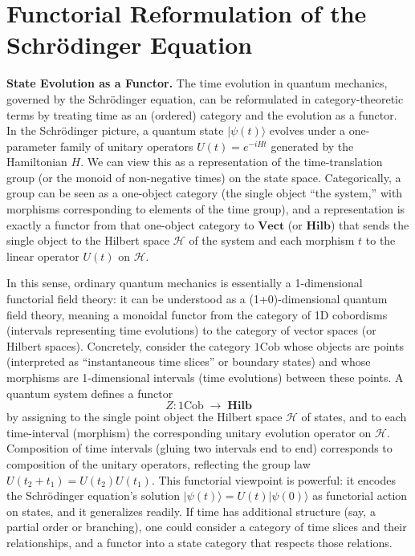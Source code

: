 \documentclass[12pt]{article}
\begin{document}
\section{Functorial Reformulation of the Schrödinger Equation}

\textbf{State Evolution as a Functor.}
The time evolution in quantum mechanics, governed by the Schrödinger equation, can be reformulated in category-theoretic terms by treating time as an (ordered) category and the evolution as a functor. In the Schrödinger picture, a quantum state $\lvert\psi(t)\rangle$ evolves under a one-parameter family of unitary operators $U(t) = e^{-iHt}$ generated by the Hamiltonian $H$. We can view this as a representation of the time-translation group (or the monoid of non-negative times) on the state space. Categorically, a group can be seen as a one-object category (the single object ``the system,'' with morphisms corresponding to elements of the time group), and a representation is exactly a functor from that one-object category to $\mathbf{Vect}$ (or $\mathbf{Hilb}$) that sends the single object to the Hilbert space $\mathcal{H}$ of the system and each morphism $t$ to the linear operator $U(t)$ on $\mathcal{H}$.

In this sense, ordinary quantum mechanics is essentially a 1-dimensional functorial field theory: it can be understood as a (1+0)-dimensional quantum field theory, meaning a monoidal functor from the category of 1D cobordisms (intervals representing time evolutions) to the category of vector spaces (or Hilbert spaces). Concretely, consider the category $1\mathrm{Cob}$ whose objects are points (interpreted as ``instantaneous time slices'' or boundary states) and whose morphisms are 1-dimensional intervals (time evolutions) between these points. A quantum system defines a functor
\[
   Z: 1\mathrm{Cob} \; \to \; \mathbf{Hilb}
\]
by assigning to the single point object the Hilbert space $\mathcal{H}$ of states, and to each time-interval (morphism) the corresponding unitary evolution operator on $\mathcal{H}$. Composition of time intervals (gluing two intervals end to end) corresponds to composition of the unitary operators, reflecting the group law $U(t_2 + t_1) = U(t_2)U(t_1)$. This functorial viewpoint is powerful: it encodes the Schrödinger equation’s solution $\lvert\psi(t)\rangle = U(t)\lvert\psi(0)\rangle$ as functorial action on states, and it generalizes readily. If time has additional structure (say, a partial order or branching), one could consider a category of time slices and their relationships, and a functor into a state category that respects those relations.
\end{document}

